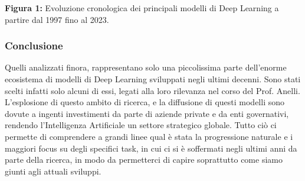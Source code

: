 \begin{center}
    
    \vspace{0.5em}
    \textbf{Figura 1:} Evoluzione cronologica dei principali modelli di Deep Learning a partire dal 1997 fino al 2023.
\end{center}

\subsubsection{Conclusione}

Quelli analizzati finora, rappresentano solo una piccolissima parte dell'enorme ecosistema di modelli di Deep Learning sviluppati negli ultimi decenni. Sono stati scelti infatti solo alcuni di essi, legati alla loro rilevanza nel corso del Prof. Anelli. L'esplosione di questo ambito di ricerca, e la diffusione di questi modelli sono dovute a ingenti investimenti da parte di aziende private e da enti governativi, rendendo l'Intelligenza Artificiale un settore strategico globale. Tutto ciò ci permette di comprendere a grandi linee qual è stata la progressione naturale e i maggiori focus su degli specifici task, in cui ci si è soffermati negli ultimi anni da parte della ricerca, in modo da permetterci di capire soprattutto come siamo giunti agli attuali sviluppi.

